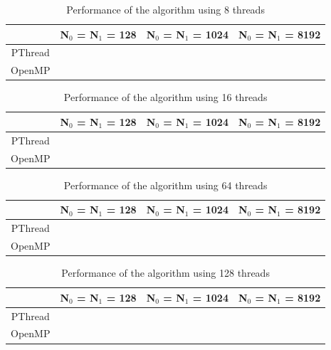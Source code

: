 \documentclass[10pt,twocolumn]{witseiepaper}
\begin{document}
\begin{table}[h]
		\centering
\caption{Performance of the algorithm using 8 threads}
\begin{tabular}{|c|c|c|c|}
	\hline 
	 & N$_{0}$ = N$_{1}$ = 128 &  N$_{0}$ = N$_{1}$ = 1024 & N$_{0}$ = N$_{1}$ = 8192 \\ 
	\hline 
	PThread &  &  &  \\ 
	\hline 
	OpenMP &  &  &  \\ 
	\hline 
\end{tabular} 
\end{table}

\begin{table}[h]
		\centering
	\caption{Performance of the algorithm using 16 threads}
\begin{tabular}{|c|c|c|c|}
	\hline 
	 & N$_{0}$ = N$_{1}$ = 128 &  N$_{0}$ = N$_{1}$ = 1024 & N$_{0}$ = N$_{1}$ = 8192 \\ 
	\hline 
	PThread &  &  &  \\ 
	\hline 
	OpenMP &  &  &  \\ 
	\hline 
\end{tabular} 
\end{table}

\begin{table}[h]
		\centering
	\caption{Performance of the algorithm using 64 threads}
\begin{tabular}{|c|c|c|c|}
	\hline 
	 & N$_{0}$ = N$_{1}$ = 128 &  N$_{0}$ = N$_{1}$ = 1024 & N$_{0}$ = N$_{1}$ = 8192 \\ 
	\hline 
	PThread &  &  &  \\ 
	\hline 
	OpenMP &  &  &  \\ 
	\hline 
\end{tabular} 
\end{table}

\begin{table}[h]
	\centering
	\caption{Performance of the algorithm using 128 threads}
	\begin{tabular}{|c|c|c|c|}
		\hline 
		& N$_{0}$ = N$_{1}$ = 128 &  N$_{0}$ = N$_{1}$ = 1024 & N$_{0}$ = N$_{1}$ = 8192 \\ 
		\hline 
		PThread &  &  &  \\ 
		\hline 
		OpenMP &  &  &  \\ 
		\hline 
	\end{tabular} 
\end{table}

%





\newpage
{}
\setcounter{page}{1}
\onecolumn
\begin{appendix} \label{sec:appendix}
		

\end{appendix}
\end{document}
